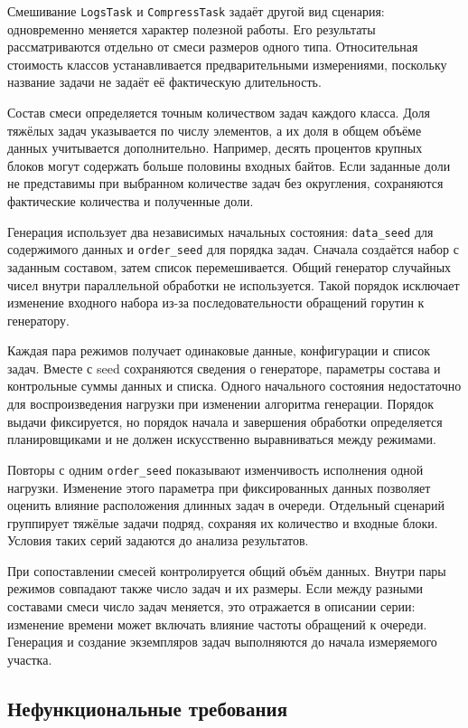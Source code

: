 Смешивание \texttt{LogsTask} и \texttt{CompressTask} задаёт другой вид сценария: одновременно
  меняется характер полезной работы. Его результаты рассматриваются отдельно от смеси размеров
  одного типа. Относительная стоимость классов устанавливается предварительными измерениями,
  поскольку название задачи не задаёт её фактическую длительность.

Состав смеси определяется точным количеством задач каждого класса. Доля тяжёлых задач указывается
  по числу элементов, а их доля в общем объёме данных учитывается дополнительно. Например,
  десять процентов крупных блоков могут содержать больше половины входных байтов.
  Если заданные доли не представимы при выбранном количестве задач без округления,
  сохраняются фактические количества и полученные доли.

Генерация использует два независимых начальных состояния: \texttt{data\_seed} для содержимого
  данных и \texttt{order\_seed} для порядка задач. Сначала создаётся набор с заданным составом,
  затем список перемешивается. Общий генератор случайных чисел внутри параллельной обработки
  не используется. Такой порядок исключает изменение входного набора из-за последовательности
  обращений горутин к генератору.

Каждая пара режимов получает одинаковые данные, конфигурации и список задач. Вместе с seed
  сохраняются сведения о генераторе, параметры состава и контрольные суммы данных и списка.
  Одного начального состояния недостаточно для воспроизведения нагрузки при изменении алгоритма
  генерации. Порядок выдачи фиксируется, но порядок начала и завершения обработки определяется
  планировщиками и не должен искусственно выравниваться между режимами.

Повторы с одним \texttt{order\_seed} показывают изменчивость исполнения одной нагрузки.
  Изменение этого параметра при фиксированных данных позволяет оценить влияние расположения
  длинных задач в очереди. Отдельный сценарий группирует тяжёлые задачи подряд, сохраняя их
  количество и входные блоки. Условия таких серий задаются до анализа результатов.

При сопоставлении смесей контролируется общий объём данных. Внутри пары режимов совпадают
  также число задач и их размеры. Если между разными составами смеси число задач меняется,
  это отражается в описании серии: изменение времени может включать влияние частоты обращений
  к очереди. Генерация и создание экземпляров задач выполняются до начала измеряемого участка.

\subsection{Нефункциональные требования}
\label{subsec:nonfunctional-requirements}

